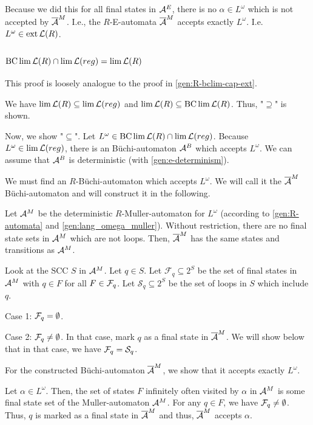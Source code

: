 Because we did this for all final states in $\mathcal{A}^E$, there is no $\alpha \in L^\omega$ which is not accepted by $\overline{\mathcal{A}}^M$. I.e., the $R$-E-automata $\overline{\mathcal{A}}^M$ accepts exactly $L^\omega$. I.e. $L^\omega \in \operatorname{ext} \mathcal{L}(R)$.

\subsection{$\operatorname{BC} \lim \mathcal{L}(R) \cap \lim \mathcal{L}(reg) = \lim \mathcal{L}(R)$}
This proof is loosely analogue to the proof in \ref{gen:R-bclim-cap-ext}.

We have $\lim \mathcal{L}(R) \subseteq \lim \mathcal{L}(reg)$ and $\lim \mathcal{L}(R) \subseteq \operatorname{BC} \lim \mathcal{L}(R)$. Thus, "$\supseteq$" is shown.

Now, we show "$\subseteq$". Let $L^\omega \in \operatorname{BC} \lim \mathcal{L}(R) \cap \lim \mathcal{L}(reg)$. Because $L^\omega \in \lim \mathcal{L}(reg)$, there is an Büchi-automaton $\mathcal{A}^B$ which accepts $L^\omega$. We can assume that $\mathcal{A}^B$ is deterministic (with \ref{gen:e-determinism}).

We must find an $R$-Büchi-automaton which accepts $L^\omega$. We will call it the $\overline{\mathcal{A}}^M$ Büchi-automaton and will construct it in the following.

Let $\mathcal{A}^M$ be the deterministic $R$-Muller-automaton for $L^\omega$ (according to \ref{gen:R-automata} and \ref{gen:lang_omega_muller}). Without restriction, there are no final state sets in $\mathcal{A}^M$ which are not loops. Then, $\overline{\mathcal{A}}^M$ has the same states and transitions as $\mathcal{A}^M$.

Look at the SCC $S$ in $\mathcal{A}^M$. Let $q \in S$. Let $\mathcal F_q \subseteq 2^S$ be the set of final states in $\mathcal{A}^M$ with $q \in F$ for all $F \in \mathcal{F}_q$. Let $\mathcal S_q \subseteq 2^S$ be the set of loops in $S$ which include $q$.

Case 1: $\mathcal{F}_q = \emptyset$. %

Case 2: $\mathcal{F}_q \neq \emptyset$.
In that case, mark $q$ as a final state in $\overline{\mathcal{A}}^M$. We will show below that in that case, we have $\mathcal{F}_q = \mathcal S_q$.

For the constructed Büchi-automaton $\overline{\mathcal{A}}^M$, we show that it accepts exactly $L^\omega$.

Let $\alpha \in L^\omega$. Then, the set of states $F$ infinitely often visited by $\alpha$ in $\mathcal{A}^M$ is some final state set of the Muller-automaton $\mathcal{A}^M$. For any $q \in F$, we have $\mathcal{F}_q \neq \emptyset$. Thus, $q$ is marked as a final state in $\overline{\mathcal{A}}^M$ and thus, $\overline{\mathcal{A}}^M$ accepts $\alpha$.

